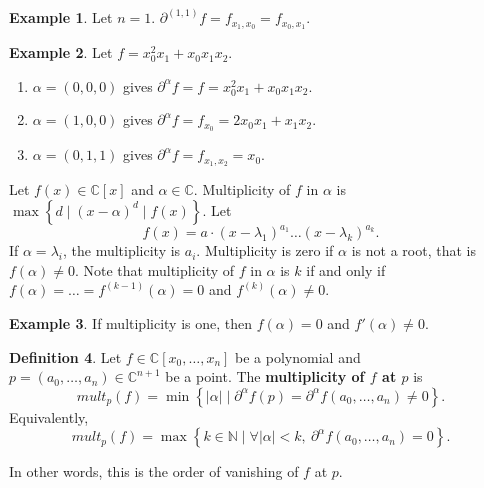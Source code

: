 \documentclass{article}
\newcommand{\N}{\mathbb{N}}
\newcommand{\C}{\mathbb{C}}
\newcommand{\rb}[1]{\left( #1 \right)}
\renewcommand{\sb}[1]{\left[ #1 \right]}
\newcommand{\cb}[1]{\left\{ #1 \right\}}
\newcommand{\abs}[1]{\left\lvert #1 \right\rvert}
\theoremstyle{definition}\newtheorem{definition}{Definition}[section]
\theoremstyle{definition}\newtheorem{notation}[definition]{Notation}
\theoremstyle{definition}\newtheorem{remark}[definition]{Remark}
\theoremstyle{definition}\newtheorem{example}[definition]{Example}
\theoremstyle{definition}\newtheorem{fact}{Fact}
\theoremstyle{definition}\newtheorem{exercise}{Exercise}
\begin{document}
\begin{example}
Let $ n = 1 $. $ \partial^{\rb{1, 1}} f = f_{x_1, x_0} = f_{x_0, x_1} $.
\end{example}

\begin{example}
Let $ f = x_0^2x_1 + x_0x_1x_2 $.
\begin{enumerate}
\item $ \alpha = \rb{0, 0, 0} $ gives $ \partial^\alpha f = f = x_0^2x_1 + x_0x_1x_2 $.
\item $ \alpha = \rb{1, 0, 0} $ gives $ \partial^\alpha f = f_{x_0} = 2x_0x_1 + x_1x_2 $.
\item $ \alpha = \rb{0, 1, 1} $ gives $ \partial^\alpha f = f_{x_1, x_2} = x_0 $.
\end{enumerate}
\end{example}

Let $ f\rb{x} \in \C\sb{x} $ and $ \alpha \in \C $. Multiplicity of $ f $ in $ \alpha $ is $ \max\cb{d \mid \rb{x - \alpha}^d \mid f\rb{x}} $. Let
$$ f\rb{x} = a \cdot \rb{x - \lambda_1}^{a_1} \dots \rb{x - \lambda_k}^{a_k}. $$
If $ \alpha = \lambda_i $, the multiplicity is $ a_i $. Multiplicity is zero if $ \alpha $ is not a root, that is $ f\rb{\alpha} \ne 0 $. Note that multiplicity of $ f $ in $ \alpha $ is $ k $ if and only if $ f\rb{\alpha} = \dots = f^{\rb{k - 1}}\rb{\alpha} = 0 $ and $ f^{\rb{k}}\rb{\alpha} \ne 0 $.

\begin{example}
If multiplicity is one, then $ f\rb{\alpha} = 0 $ and $ f'\rb{\alpha} \ne 0 $.
\end{example}

\begin{definition}
Let $ f \in \C\sb{x_0, \dots, x_n} $ be a polynomial and $ p = \rb{a_0, \dots, a_n} \in \C^{n + 1} $ be a point. The \textbf{multiplicity of $ f $ at $ p $} is
$$ mult_p\rb{f} = \min\cb{\abs{\alpha} \mid \partial^\alpha f\rb{p} = \partial^\alpha f\rb{a_0, \dots, a_n} \ne 0}. $$
Equivalently,
$$ mult_p\rb{f} = \max\cb{k \in \N \mid \forall \abs{\alpha} < k, \ \partial^\alpha f\rb{a_0, \dots, a_n} = 0}. $$
\end{definition}


In other words, this is the order of vanishing of $ f $ at $ p $.
\end{document}
